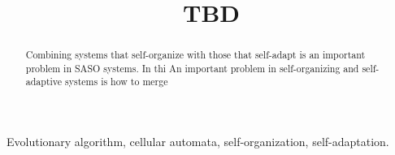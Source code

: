 \documentclass[10pt, conference, compsocconf]{IEEEtran}
\begin{document}
\sloppy

\title{TBD}

\author{
}
\maketitle

\begin{abstract}
Combining systems that self-organize with those that self-adapt is an important problem in SASO systems.  In thi
An important problem in self-organizing and self-adaptive systems is how to merge 
\end{abstract}

\begin{IEEEkeywords}
Evolutionary algorithm, cellular automata, self-organization, self-adaptation.
\end{IEEEkeywords}





\end{document}
